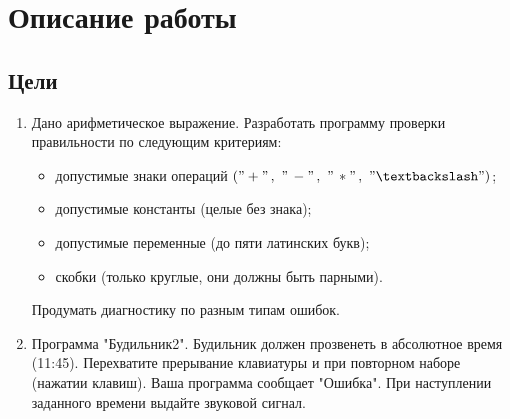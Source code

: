 \documentclass{article}
\begin{document}
\begin{titlepage}
\flushright{
{\today}\\[0.5cm] %
}

 

\vfill %

\end{titlepage}


\tableofcontents
\newpage



\section{Описание работы}

\subsection{Цели}
\begin{enumerate}
\item Дано арифметическое выражение. Разработать программу
проверки правильности по следующим критериям:
\begin{itemize}
	\item допустимые знаки операций $("+" \,,\ "\,-" \,,\ "\,*" \,,\  "\textbackslash")$;
	\item допустимые константы (целые без знака);
	\item допустимые переменные (до пяти латинских букв);
	\item скобки (только круглые, они должны быть парными).
\end{itemize}
Продумать диагностику по разным типам ошибок.
\item Программа "Будильник2". Будильник должен прозвенеть в абсолютное время (11:45). Перехватите прерывание клавиатуры и при повторном наборе (нажатии клавиш). Ваша программа сообщает "Ошибка". При наступлении заданного времени выдайте звуковой сигнал.
 \end{enumerate}
\end{document}
